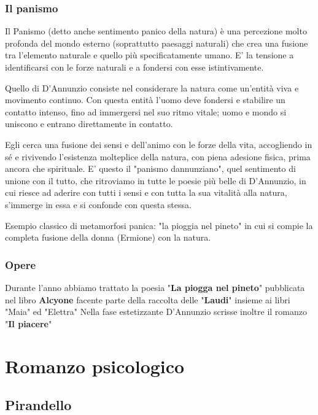 \documentclass[10pt]{report}
\begin{document}
			\subsection[Panismo]{Il panismo}
			Il Panismo (detto anche sentimento panico della natura) è una percezione molto profonda del mondo esterno (soprattutto paesaggi naturali) che crea una fusione tra l'elemento naturale e quello più specificatamente umano. E' la tensione a identificarsi con le forze naturali e a fondersi con esse istintivamente.
			
			Quello di D'Annunzio consiste nel considerare la natura come un'entità viva e movimento continuo.
			Con questa entità l'uomo deve fondersi e stabilire un contatto intenso, fino ad immergersi nel suo ritmo vitale; uomo e mondo si uniscono e entrano direttamente in contatto. 
			
			
			Egli cerca una fusione dei sensi e dell'animo con le forze della vita, accogliendo in sé e rivivendo l'esistenza molteplice della natura, con piena adesione fisica, prima ancora che spirituale. E' questo il "panismo dannunziano", quel sentimento di unione con il tutto, che ritroviamo in tutte le poesie più belle di D'Annunzio, in cui riesce ad aderire con tutti i sensi e con tutta la sua vitalità alla natura, s'immerge in essa e si confonde con questa stessa.
			
			Esempio classico di metamorfosi panica: "la pioggia nel pineto" in cui si compie la completa fusione della donna (Ermione) con la natura.
			
			\subsection[Opere]{Opere}
			Durante l'anno abbiamo trattato la poesia "\textbf{La piogga nel pineto}" pubblicata nel libro \textbf{Alcyone} facente parte della raccolta delle "\textbf{Laudi}" insieme ai libri "Maia" ed "Elettra"
			Nella fase estetizzante D'Annunzio scrisse inoltre il romanzo "\textbf{Il piacere}"
	
	\chapter{Romanzo psicologico}
	
	\section{Pirandello}
\end{document}
